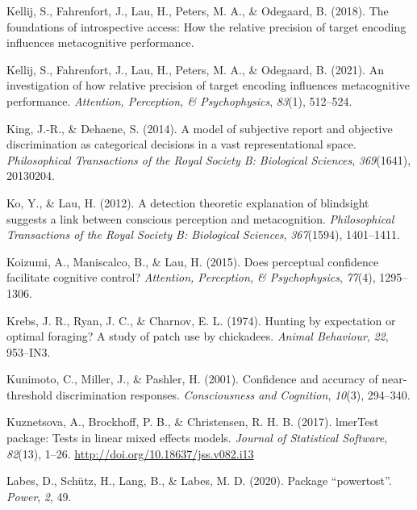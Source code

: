 \documentclass[12pt,twoside]{reedthesis}
\begin{document}
\leavevmode\hypertarget{ref-kellij2018foundations}{}%
Kellij, S., Fahrenfort, J., Lau, H., Peters, M. A., \& Odegaard, B. (2018). The foundations of introspective access: How the relative precision of target encoding influences metacognitive performance.

\leavevmode\hypertarget{ref-kellij2021investigation}{}%
Kellij, S., Fahrenfort, J., Lau, H., Peters, M. A., \& Odegaard, B. (2021). An investigation of how relative precision of target encoding influences metacognitive performance. \emph{Attention, Perception, \& Psychophysics}, \emph{83}(1), 512--524.

\leavevmode\hypertarget{ref-king2014model}{}%
King, J.-R., \& Dehaene, S. (2014). A model of subjective report and objective discrimination as categorical decisions in a vast representational space. \emph{Philosophical Transactions of the Royal Society B: Biological Sciences}, \emph{369}(1641), 20130204.

\leavevmode\hypertarget{ref-ko2012detection}{}%
Ko, Y., \& Lau, H. (2012). A detection theoretic explanation of blindsight suggests a link between conscious perception and metacognition. \emph{Philosophical Transactions of the Royal Society B: Biological Sciences}, \emph{367}(1594), 1401--1411.

\leavevmode\hypertarget{ref-koizumi2015does}{}%
Koizumi, A., Maniscalco, B., \& Lau, H. (2015). Does perceptual confidence facilitate cognitive control? \emph{Attention, Perception, \& Psychophysics}, \emph{77}(4), 1295--1306.

\leavevmode\hypertarget{ref-krebs1974hunting}{}%
Krebs, J. R., Ryan, J. C., \& Charnov, E. L. (1974). Hunting by expectation or optimal foraging? A study of patch use by chickadees. \emph{Animal Behaviour}, \emph{22}, 953--IN3.

\leavevmode\hypertarget{ref-kunimoto2001confidence}{}%
Kunimoto, C., Miller, J., \& Pashler, H. (2001). Confidence and accuracy of near-threshold discrimination responses. \emph{Consciousness and Cognition}, \emph{10}(3), 294--340.

\leavevmode\hypertarget{ref-R-lmerTest}{}%
Kuznetsova, A., Brockhoff, P. B., \& Christensen, R. H. B. (2017). lmerTest package: Tests in linear mixed effects models. \emph{Journal of Statistical Software}, \emph{82}(13), 1--26. \url{http://doi.org/10.18637/jss.v082.i13}

\leavevmode\hypertarget{ref-labes2020package}{}%
Labes, D., Schütz, H., Lang, B., \& Labes, M. D. (2020). Package ``powertost''. \emph{Power}, \emph{2}, 49.
\end{document}
